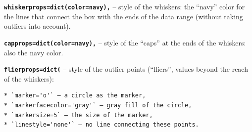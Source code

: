 \documentclass[
  english,
  letterpaper,
  DIV=11,
  numbers=noendperiod]{scrreprt}
\newcounter{none} %
\begin{document}
\textbf{\texttt{whiskerprops=dict(color=\textquotesingle{}navy\textquotesingle{}),}}
-- style of the whiskers: the ``navy'' color for the lines that connect
the box with the ends of the data range (without taking outliers into
account).

\textbf{\texttt{capprops=dict(color=\textquotesingle{}navy\textquotesingle{}),}}
-- style of the ``caps'' at the ends of the whiskers: also the navy
color.

\textbf{\texttt{flierprops=dict(}} -- style of the outlier points
(``fliers'', values beyond the reach of the whiskers):

\begin{verbatim}
* `marker='o'` – a circle as the marker,
* `markerfacecolor='gray'` – gray fill of the circle,
* `markersize=5` – the size of the marker,
* `linestyle='none'` – no line connecting these points.
\end{verbatim}
\end{document}
